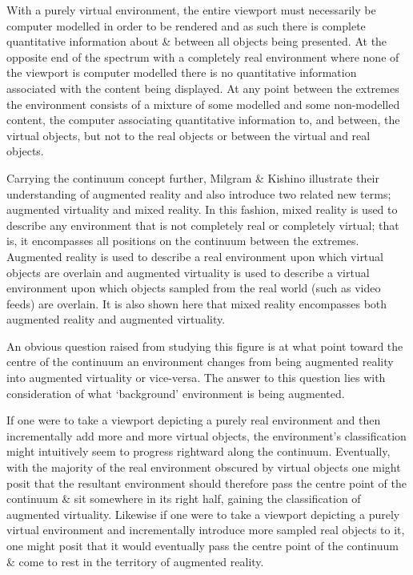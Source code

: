 With a purely virtual environment, the entire viewport must necessarily be computer modelled in order to be rendered and as such there is complete quantitative information about \& between all objects being presented. At the opposite end of the spectrum with a completely real environment where none of the viewport is computer modelled there is no quantitative information associated with the content being displayed. At any point between the extremes the environment consists of a mixture of some modelled and some non-modelled content, the computer associating quantitative information to, and between, the virtual objects, but not to the real objects or between the virtual and real objects.

Carrying the continuum concept further, Milgram \& Kishino illustrate their understanding of augmented reality and also introduce two related new terms; augmented virtuality and mixed reality. In this fashion, mixed reality is used to describe any environment that is not completely real or completely virtual; that is, it encompasses all positions on the continuum between the extremes. Augmented reality is used to describe a real environment upon which virtual objects are overlain and augmented virtuality is used to describe a virtual environment upon which objects sampled from the real world (such as video feeds) are overlain. It is also shown here that mixed reality encompasses both augmented reality and augmented virtuality.

An obvious question raised from studying this figure is at what point toward the centre of the continuum an environment changes from being augmented reality into augmented virtuality or vice-versa. The answer to this question lies with consideration of what `background' environment is being augmented.

If one were to take a viewport depicting a purely real environment and then incrementally add more and more virtual objects, the environment's classification might intuitively seem to progress rightward along the continuum. Eventually, with the majority of the real environment obscured by virtual objects one might posit that the resultant environment should therefore pass the centre point of the continuum \& sit somewhere in its right half, gaining the classification of augmented virtuality. Likewise if one were to take a viewport depicting a purely virtual environment and incrementally introduce more sampled real objects to it, one might posit that it would eventually pass the centre point of the continuum \& come to rest in the territory of augmented reality.

